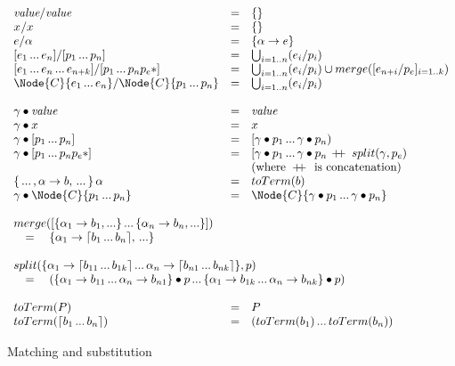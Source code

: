 \begin{figure}[t]
\[\begin{array}{lclll}
\Match{\Value}{\Value} &=& \{\} \\
\Match{\VarX}{\VarX} &=& \{\} \\
\Match{e}{\PVarA} &=& \{\PVarA \to e\} \\
\Match{[e_1 \dd e_n]}{[p_1 \dd p_n]} &=&
  \bigcup_{i=1..n} (\Match{e_i}{p_i}) \\
\Match{[e_1 \dd e_n \dd e_{n+k}]}{[p_1 \dd p_n \Ell{p_e}]} &=&
  \bigcup_{i=1..n} (\Match{e_i}{p_i}) \cup
  merge([\Match{e_{n+i}}{p_e}]_{i=1..k}) \\
\Match{\Node{C}{e_1 \dd e_n}}{\Node{C}{p_1 \dd p_n}} &=&
  \bigcup_{i=1..n} (\Match{e_i}{p_i}) \\ \\

\Subs{\gamma}{\Value}        &=& \Value \\
\Subs{\gamma}{\VarX}        &=& \VarX \\
\Subs{\gamma}{[p_1 \dd p_n]}    &=& [\Subs{\gamma}{p_1} \dd \Subs{\gamma}{p_n}) \\
\Subs{\gamma}{[p_1 \dd p_n \Ell{p_e}]} &=&
  [\Subs{\gamma}{p_1} \dd \Subs{\gamma}{p_n\,\DoublePlus\,split(\gamma, p_e)} \\
    &&\text{(where } \DoublePlus \text{ is concatenation)} \\
\{\dd,\PVarA \to b,\dd\}\,\PVarA &=& toTerm(b) \\
\Subs{\gamma}{\Node{C}{p_1 \dd p_n}} &=&
  \Node{C}{\Subs{\gamma}{p_1} \dd \Subs{\gamma}{p_n}} \\ \\

\multicolumn{3}{l}{merge([\{\PVarA_1 \to b_1,...\} \dd \{\PVarA_n \to b_n,...\}])} \\
\multicolumn{3}{l}{\quad=\quad \{\PVarA_1 \to \BList{b_1 \dd b_n},\,...\}} \\ \\

\multicolumn{3}{l}{split(\{\PVarA_1 \to \BList{b_{11} \dd b_{1k}} \dd 
  \PVarA_n \to \BList{b_{n1} \dd b_{nk}}\}, p)} \\
\multicolumn{3}{l}{\quad=\quad
  (\Subs{\{\PVarA_1 \to b_{11} \dd  \PVarA_n \to b_{n1}\}}{p} \dd 
   \Subs{\{\PVarA_1 \to b_{1k} \dd  \PVarA_n \to b_{nk}\}}{p})} \\ \\

toTerm(P) &=& P \\
toTerm(\BList{b_1 \dd b_n}) &=&
  (toTerm(b_1) \dd toTerm(b_n))

\end{array}\]
\caption{Matching and substitution}
\label{fig:reval-formal-subs}
\end{figure}

